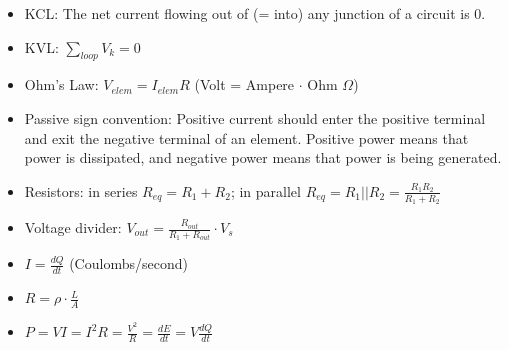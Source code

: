 \documentclass{article}
\begin{document}
\begin{itemize}
	\item KCL: The net current flowing out of (= into) any junction of a circuit is 0.
	\item KVL: $\sum\limits_{loop} V_k = 0$
	\item Ohm's Law: $V_{elem} = I_{elem}R$ (Volt = Ampere $\cdot$ Ohm $\Omega$)
	\item Passive sign convention: Positive current should enter the positive terminal and exit the negative terminal of an element. Positive power means that power is dissipated, and negative power means that power is being generated.
	\item Resistors: in series $R_{eq} = R_1+R_2$; in parallel $R_{eq} = R_1||R_2 = \frac{R_1R_2}{R_1+R_2}$
	\item {\color{red} Voltage divider}: $V_{out} = \frac{R_{out}}{R_1+R_{out}}\cdot V_s$
	\item $I = \frac{dQ}{dt}$ (Coulombs/second)
	\item {\color{red} $R = \rho\cdot\frac{L}{A}$}
	\item $P = VI = I^2R = \frac{V^2}{R} = \frac{dE}{dt} = V\frac{dQ}{dt}$
\end{itemize}
\end{document}
